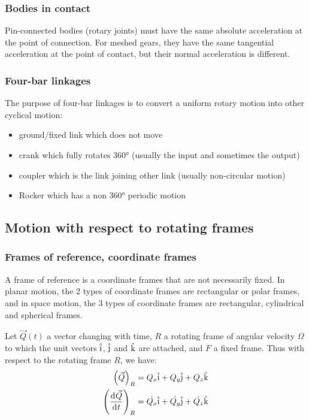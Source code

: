 \documentclass[10pt, twocolumn]{article}
\begin{document}
\subsubsection{Bodies in contact}
Pin-connected bodies (rotary joints) must have the same absolute acceleration at the point of connection.
For meshed gears, they have the same tangential acceleration at the point of contact, but their normal acceleration is different.


\subsubsection{Four-bar linkages}
The purpose of four-bar linkages is to convert a uniform rotary motion into other cyclical motion:
\begin{itemize}
  \item ground/fixed link which does not move
  \item crank which fully rotates 360° (usually the input and sometimes the output)
  \item coupler which is the link joining other link (usually non-circular motion)
  \item Rocker which has a non 360° periodic motion
\end{itemize}


\subsection{Motion with respect to rotating frames}
\subsubsection{Frames of reference, coordinate frames}
A frame of reference is a coordinate frames that are not necessarily fixed.
In planar motion, the 2 types of coordinate frames are rectangular or polar frames, and in space motion, the 3 types of coordinate frames are rectangular, cylindrical and spherical frames.

Let \(\vec{Q}(t)\) a vector changing with time, \(R\) a rotating frame of angular velocity \(\Omega\) to which the unit vectors \(\hat{\mathrm{i}}\), \(\hat{\mathrm{j}}\) and \(\hat{\mathrm{k}}\) are attached, and \(F\) a fixed frame.
Thus with respect to the rotating frame \(R\), we have:
\begin{align*}
  \left( \vec{Q} \right)_{R}                 & = Q_x \hat{\mathrm{i}} + Q_y \hat{\mathrm{j}} + Q_z \hat{\mathrm{k}}                   \\
  \left( \frac{\mathrm{d}^{} \vec{Q}}{\mathrm{d}^{} t} \right)_{R} & = \dot{Q_x} \hat{\mathrm{i}} + \dot{Q_y} \hat{\mathrm{j}} + \dot{Q_z} \hat{\mathrm{k}}
\end{align*}
\end{document}
